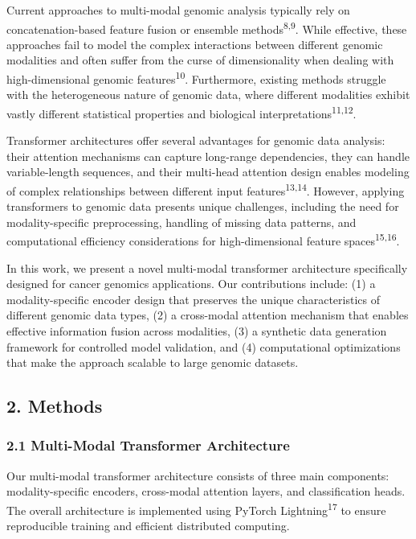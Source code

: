 Current approaches to multi-modal genomic analysis typically rely on
concatenation-based feature fusion or ensemble
methods\textsuperscript{8,9}. While effective, these approaches fail to
model the complex interactions between different genomic modalities and
often suffer from the curse of dimensionality when dealing with
high-dimensional genomic features\textsuperscript{10}. Furthermore,
existing methods struggle with the heterogeneous nature of genomic data,
where different modalities exhibit vastly different statistical
properties and biological interpretations\textsuperscript{11,12}.

Transformer architectures offer several advantages for genomic data
analysis: their attention mechanisms can capture long-range
dependencies, they can handle variable-length sequences, and their
multi-head attention design enables modeling of complex relationships
between different input features\textsuperscript{13,14}. However,
applying transformers to genomic data presents unique challenges,
including the need for modality-specific preprocessing, handling of
missing data patterns, and computational efficiency considerations for
high-dimensional feature spaces\textsuperscript{15,16}.

In this work, we present a novel multi-modal transformer architecture
specifically designed for cancer genomics applications. Our
contributions include: (1) a modality-specific encoder design that
preserves the unique characteristics of different genomic data types,
(2) a cross-modal attention mechanism that enables effective information
fusion across modalities, (3) a synthetic data generation framework for
controlled model validation, and (4) computational optimizations that
make the approach scalable to large genomic datasets.

\subsection{2. Methods}\label{methods}

\subsubsection{2.1 Multi-Modal Transformer
Architecture}\label{multi-modal-transformer-architecture}

Our multi-modal transformer architecture consists of three main
components: modality-specific encoders, cross-modal attention layers,
and classification heads. The overall architecture is implemented using
PyTorch Lightning\textsuperscript{17} to ensure reproducible training
and efficient distributed computing.

